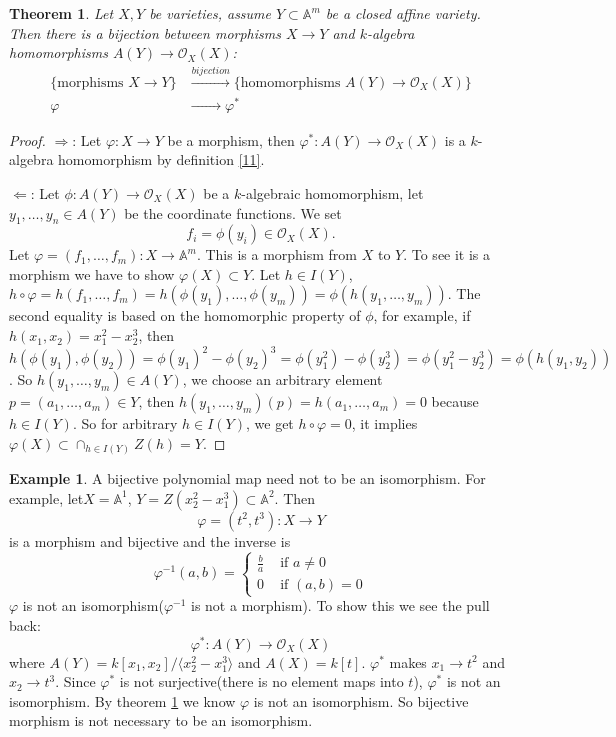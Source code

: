 \documentclass{amsart}
\theoremstyle{plain}
\newtheorem{theorem}{Theorem}
\theoremstyle{definition}
\newtheorem{example}{Example}
\theoremstyle{remark}
\numberwithin{equation}{section}
\begin{document}
\begin{theorem}\label{12}
	Let $ X,Y $ be varieties, assume $ Y\subset \mathbb{A}^m $ be a closed affine variety. Then there is a bijection between morphisms $ X\to Y $ and $ k $-algebra homomorphisms $ A(Y)\to \mathcal{O}_X(X) $:
$$\begin{array}{cc}
	\{ \text{morphisms } X\to Y \} & \xrightarrow{bijection}\{ \text{homomorphisms }A(Y)\to \mathcal{O}_X(X) \} \\
	\varphi & \xrightarrow{\qquad\quad}  \varphi^\ast
\end{array}$$
\end{theorem}
\begin{proof}
	$ \Rightarrow $: Let $ \varphi :X\to Y $ be a morphism, then $ \varphi^\ast: A(Y)\to \mathcal{O}_X(X) $ is a $ k $-algebra homomorphism by definition \ref{11}.

	$ \Leftarrow $: Let $\phi:A(Y)\to \mathcal{O}_X(X)  $ be a $ k $-algebraic homomorphism, let $ y_1,\dots,y_n\in A(Y) $ be the coordinate functions. We set
	$$
	f_i=\phi(y_i)\in \mathcal{O}_X(X).
	$$
	Let $ \varphi=(f_1,\dots,f_m):X\to \mathbb{A}^m $.
	This is a morphism from $ X $ to $ Y $. To see it is a morphism we have to show $ \varphi(X)\subset Y $. Let $ h\in I(Y) $, $ h\circ \varphi =h(f_1,\dots,f_m)=h(\phi(y_1),\dots,\phi(y_m))=\phi (h(y_1,\dots,y_m)) $. The second equality is based on the homomorphic property of $ \phi $, for example, if $ h(x_1,x_2)=x_1^2-x_2^3 $, then $ h(\phi(y_1),\phi(y_2))=\phi(y_1)^2-\phi(y_2)^3= \phi(y_1^2)-\phi(y_2^3)=\phi(y_1^2-y_2^3)=\phi(h(y_1,y_2)) $. So $ h(y_1,\dots,y_m)\in A(Y) $, we choose an arbitrary element $ p=(a_1,\dots,a_m)\in Y $, then $ h(y_1,\dots,y_m)(p)=h(a_1,\dots,a_m)=0 $ because $ h\in I(Y) $. So for arbitrary $ h\in I(Y) $, we get $ h\circ\varphi=0 $, it implies $ \varphi(X)\subset \mathop{\cap}_{h\in I(Y)} Z(h)= Y $.
\end{proof}
\begin{example}
	A bijective polynomial map need not to be an isomorphism. For example, let$ X=\mathbb{A}^1 $, $ Y=Z(x_2^2-x_1^3) \subset \mathbb{A}^2 $. Then
	$$
	\varphi=(t^2,t^3):X\to Y
	$$
	is a morphism and bijective and the inverse is
	$$
		\varphi^{-1}(a,b)=\left\lbrace \begin{matrix}
		\frac{b}{a} & \text{ if } a\neq 0\\
		0 & \text{ if } (a,b)=0
		\end{matrix}\right.
	$$
	$ \varphi $ is not an isomorphism($ \varphi^{-1} $ is not a morphism). To show this we see the pull back:
	$$
		\varphi^\ast : A(Y)\to \mathcal{O}_X(X)
	$$
	where $ A(Y)=k[x_1,x_2]/\langle x_2^2-x_1^3\rangle $ and $ A(X)=k[t] $. $ \varphi^\ast $ makes $ x_1\to t^2 $ and $ x_2\to t^3 $. Since $ \varphi^\ast $ is not surjective(there is no element maps into $ t $), $ \varphi^\ast $ is not an isomorphism. By theorem \ref{12} we know $ \varphi $ is not an isomorphism. So bijective morphism is not necessary to be an isomorphism.
\end{example}
\end{document}

